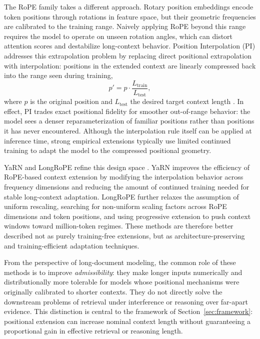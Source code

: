 \documentclass{article}
\begin{document}
The RoPE family takes a different approach. Rotary position embeddings encode token positions through rotations in feature space, but their geometric frequencies are calibrated to the training range. Naively applying RoPE beyond this range requires the model to operate on unseen rotation angles, which can distort attention scores and destabilize long-context behavior. Position Interpolation (PI) addresses this extrapolation problem by replacing direct positional extrapolation with interpolation: positions in the extended context are linearly compressed back into the range seen during training,
\begin{equation}
p' = p \cdot \frac{L_{\mathrm{train}}}{L_{\mathrm{test}}},
\end{equation}
where $p$ is the original position and $L_{\mathrm{test}}$ the desired target context length \citep{chen2023pi}. In effect, PI trades exact positional fidelity for smoother out-of-range behavior: the model sees a denser reparameterization of familiar positions rather than positions it has never encountered. Although the interpolation rule itself can be applied at inference time, strong empirical extensions typically use limited continued training to adapt the model to the compressed positional geometry.

YaRN and LongRoPE refine this design space \citep{peng2023yarn, ding2024longrope}. YaRN improves the efficiency of RoPE-based context extension by modifying the interpolation behavior across frequency dimensions and reducing the amount of continued training needed for stable long-context adaptation. LongRoPE further relaxes the assumption of uniform rescaling, searching for non-uniform scaling factors across RoPE dimensions and token positions, and using progressive extension to push context windows toward million-token regimes. These methods are therefore better described not as purely training-free extensions, but as architecture-preserving and training-efficient adaptation techniques.

From the perspective of long-document modeling, the common role of these methods is to improve \emph{admissibility}: they make longer inputs numerically and distributionally more tolerable for models whose positional mechanisms were originally calibrated to shorter contexts. They do not directly solve the downstream problems of retrieval under interference or reasoning over far-apart evidence. This distinction is central to the framework of Section~\ref{sec:framework}: positional extension can increase nominal context length without guaranteeing a proportional gain in effective retrieval or reasoning length.
\end{document}
